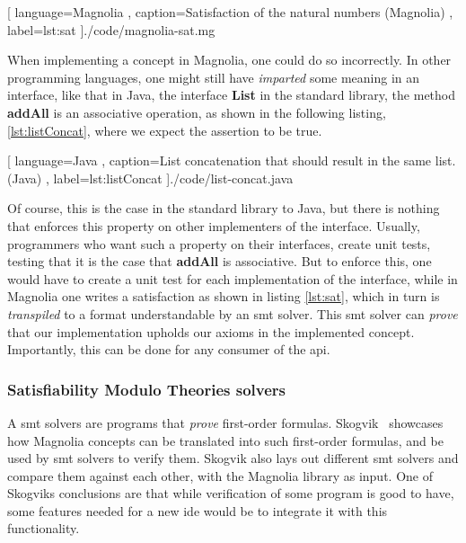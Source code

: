 \begin{center}
  
    [ language=Magnolia
    , caption={Satisfaction of the natural numbers (Magnolia)}
    , label=lst:sat
    ]{./code/magnolia-sat.mg}
\end{center}

When implementing a concept in Magnolia, one could do so incorrectly. In other
programming languages, one might still have \textit{imparted} some meaning in an
interface, like that in Java, the interface \textbf{List} in the standard
library, the method \textbf{addAll} is an associative operation, as shown in
the following listing, \ref{lst:listConcat}, where we expect the assertion to be
true.

\begin{code}
  
    [ language=Java
    , caption={List concatenation that should result in the same list. (Java)}
    , label=lst:listConcat
    ]{./code/list-concat.java}
\end{code}

Of course, this is the case in the standard library to Java, but there is
nothing that enforces this property on other implementers of the interface.
Usually, programmers who want such a property on their interfaces, create unit
tests, testing that it is the case that \textbf{addAll} is associative. But to
enforce this, one would have to create a unit test for each implementation of
the interface, while in Magnolia one writes a satisfaction as shown in listing
\ref{lst:sat}, which in turn is \textit{transpiled} to a format understandable
by an \gls*{smt} solver. This \gls*{smt} solver can \textit{prove} that our
implementation upholds our axioms in the implemented concept. Importantly, this
can be done for any consumer of the \gls*{api}.


\subsubsection{Satisfiability Modulo Theories solvers}

A \gls*{smt} solvers are programs that \textit{prove} first-order formulas.
Skogvik~\cite{beateVerification} showcases how Magnolia concepts can be
translated into such first-order formulas, and be used by \gls*{smt} solvers to
verify them. Skogvik also lays out different \gls*{smt} solvers and compare them
against each other, with the Magnolia library as input. One of Skogviks
conclusions are that while verification of some program is good to have, some
features needed for a new \gls*{ide} would be to integrate it with this
functionality.


